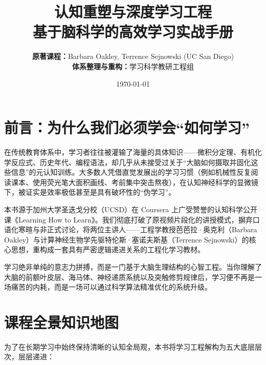 \documentclass[12pt,a4paper,openany]{ctexbook}
\begin{document}
\frontmatter

\title{\Huge\bfseries 认知重塑与深度学习工程\\
\Large 基于脑科学的高效学习实战手册}
\author{\textbf{原著课程：}Barbara Oakley, Terrence Sejnowski (UC San Diego)\\
\textbf{体系整理与重构：}学习科学教研工程组}
\date{\today}

\maketitle

\chapter*{前言：为什么我们必须学会“如何学习”}

在传统教育体系中，学习者往往被灌输了海量的具体知识——微积分定理、有机化学反应式、历史年代、编程语法，却几乎从未接受过关于“大脑如何摄取并固化这些信息”的元认知训练。大多数人凭借直觉发展出的学习习惯（例如机械性反复阅读课本、使用荧光笔大面积画线、考前集中突击熬夜），在认知神经科学的显微镜下，被证实是效率极低甚至是具有破坏性的“伪学习”。

本书源于加州大学圣迭戈分校（UCSD）在 Coursera 上广受赞誉的认知科学公开课《Learning How to Learn》。我们彻底打破了原视频片段化的讲授模式，摒弃口语化寒暄与非正式讨论，将两位主讲人——工程学教授芭芭拉·奥克利（Barbara Oakley）与计算神经生物学先驱特伦斯·塞诺夫斯基（Terrence Sejnowski）的核心思想，重构成一套具有严密逻辑递进关系的工程化学习教材。

学习绝非单纯的意志力拼搏，而是一门基于大脑生理结构的心智工程。当你理解了大脑的前额叶皮层、海马体、神经递质系统以及突触修剪规律后，学习便不再是一场痛苦的内耗，而是一场可以通过科学算法精准优化的系统升级。

\chapter*{课程全景知识地图}

为了在长期学习中始终保持清晰的认知全局观，本书将学习工程解构为五大底层层次，层层递进：
\end{document}
